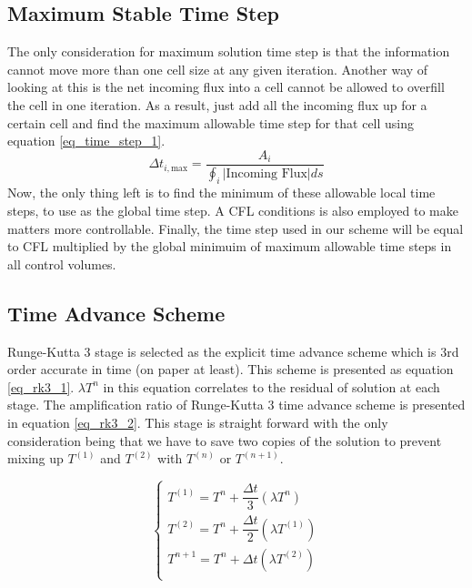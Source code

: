 \documentclass{article}
\begin{document}
\subsection{Maximum Stable Time Step}
The only consideration for maximum solution time step is that the information cannot move more than one cell size at any given iteration. Another way of looking at this is the net incoming flux into a cell cannot be allowed to overfill the cell in one iteration. As a result, just add all the incoming flux up for a certain cell and find the maximum allowable time step for that cell using equation \ref{eq_time_step_1}.
\begin{equation}
\label{eq_time_step_1}
\Delta t_{i, \text{max}}=\dfrac{A_i}{\oint_i\left|  \text{Incoming Flux} \right| ds}
\end{equation}
Now, the only thing left is to find the minimum of these allowable local time steps, to use as the global time step. A {CFL} conditions is also employed to make matters more controllable. Finally, the time step used in our scheme will be equal to CFL multiplied by the global minimuim of maximum allowable time steps in all control volumes.

\subsection{Time Advance Scheme}
Runge-Kutta 3 stage is selected as the explicit time advance scheme which is 3rd order accurate in time (on paper at least). This scheme is presented as equation \ref{eq_rk3_1}. $\lambda T^n$ in this equation correlates to the residual of solution at each stage. The amplification ratio of Runge-Kutta 3 time advance scheme is presented in equation \ref{eq_rk3_2}. This stage is straight forward with the only consideration being that we have to save two copies of the solution to prevent mixing up $T^{(1)}$ and $T^{(2)}$ with  $T^{(n)}$ or  $T^{(n+1)}$.

\begin{equation}
\label{eq_rk3_1}
\begin{cases}
T^{(1)}=T^n+\dfrac{\Delta t}{3} \left( \lambda T^n \right)\\[10 pt]
T^{(2)}=T^n+\dfrac{\Delta t}{2} \left( \lambda T^{(1)} \right)\\[10 pt]
T^{n+1}=T^n+ \Delta t \left( \lambda T^{(2)} \right)\\
\end{cases}
\end{equation}
\end{document}
